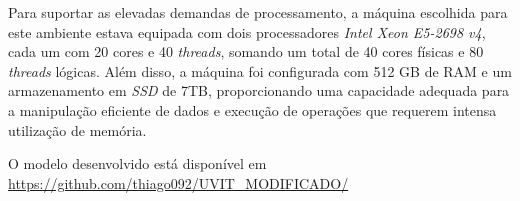 Para suportar as elevadas demandas de processamento, a máquina escolhida para este ambiente estava equipada com dois processadores \textit{Intel Xeon E5-2698 v4}, cada um com 20 cores e 40 \textit{threads}, somando um total de 40 cores físicas e 80 \textit{threads} lógicas. Além disso, a máquina foi configurada com 512 GB de RAM e um armazenamento em \textit{SSD} de 7TB, proporcionando uma capacidade adequada para a manipulação eficiente de dados e execução de operações que requerem intensa utilização de memória.

O modelo desenvolvido está disponível em \url{https://github.com/thiago092/UVIT_MODIFICADO/}

